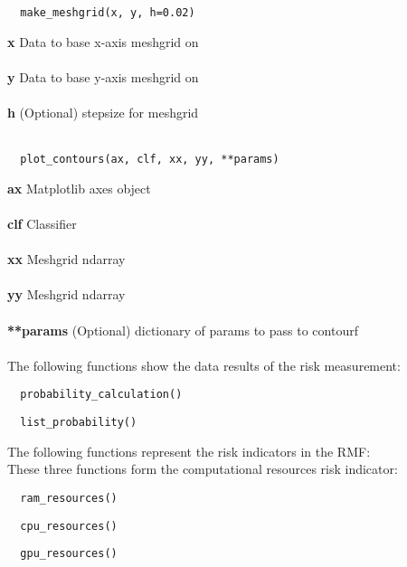 \begin{lstlisting}
  make_meshgrid(x, y, h=0.02)
\end{lstlisting}

\noindent\textbf{x}
Data to base x-axis meshgrid on \\ \\
\textbf{y}
Data to base y-axis meshgrid on \\ \\
\textbf{h}
(Optional) stepsize for meshgrid \\ \\

\begin{lstlisting}
  plot_contours(ax, clf, xx, yy, **params)
\end{lstlisting}

\noindent\textbf{ax}
Matplotlib axes object \\ \\
\textbf{clf}
Classifier \\ \\
\textbf{xx}
Meshgrid ndarray \\ \\
\textbf{yy}
Meshgrid ndarray \\ \\
\textbf{**params}
(Optional) dictionary of params to pass to contourf \\ \\

The following functions show the data results of the risk measurement: \\

\begin{lstlisting}
  probability_calculation()
\end{lstlisting}

\begin{lstlisting}
  list_probability()
\end{lstlisting}

The following functions represent the risk indicators in the RMF: \\
These three functions form the computational resources risk indicator: \\
\begin{lstlisting}
  ram_resources()
\end{lstlisting}

\begin{lstlisting}
  cpu_resources()
\end{lstlisting}

\begin{lstlisting}
  gpu_resources()
\end{lstlisting}

